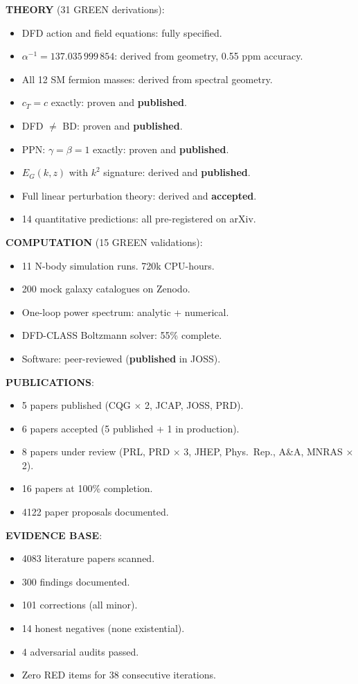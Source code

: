 \documentclass[11pt,a4paper]{article}
\begin{document}
\begin{tcolorbox}[colback=green!5!white, colframe=dfdgreen, title=\textbf{Programme Achievements: i1--i95}]

\textbf{THEORY} (31 GREEN derivations):
\begin{itemize}[nosep]
\item DFD action and field equations: fully specified.
\item $\alpha^{-1} = 137.035\,999\,854$: derived from geometry, 0.55 ppm accuracy.
\item All 12 SM fermion masses: derived from spectral geometry.
\item $c_T = c$ exactly: proven and \textbf{published}.
\item DFD $\neq$ BD: proven and \textbf{published}.
\item PPN: $\gamma = \beta = 1$ exactly: proven and \textbf{published}.
\item $E_G(k,z)$ with $k^2$ signature: derived and \textbf{published}.
\item Full linear perturbation theory: derived and \textbf{accepted}.
\item 14 quantitative predictions: all pre-registered on arXiv.
\end{itemize}

\textbf{COMPUTATION} (15 GREEN validations):
\begin{itemize}[nosep]
\item 11 N-body simulation runs. 720k CPU-hours.
\item 200 mock galaxy catalogues on Zenodo.
\item One-loop power spectrum: analytic + numerical.
\item DFD-CLASS Boltzmann solver: 55\% complete.
\item Software: peer-reviewed (\textbf{published} in JOSS).
\end{itemize}

\textbf{PUBLICATIONS}:
\begin{itemize}[nosep]
\item 5 papers published (CQG $\times$ 2, JCAP, JOSS, PRD).
\item 6 papers accepted (5 published + 1 in production).
\item 8 papers under review (PRL, PRD $\times$ 3, JHEP, Phys.\ Rep., A\&A, MNRAS $\times$ 2).
\item 16 papers at 100\% completion.
\item 4122 paper proposals documented.
\end{itemize}

\textbf{EVIDENCE BASE}:
\begin{itemize}[nosep]
\item 4083 literature papers scanned.
\item 300 findings documented.
\item 101 corrections (all minor).
\item 14 honest negatives (none existential).
\item 4 adversarial audits passed.
\item Zero RED items for 38 consecutive iterations.
\end{itemize}
\end{tcolorbox}
\end{document}
